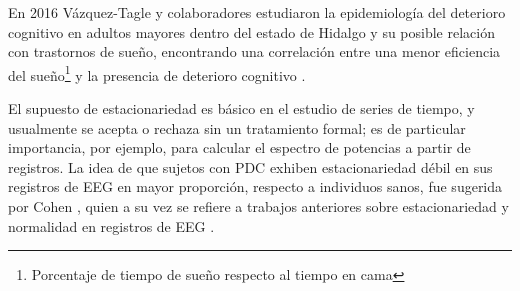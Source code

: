 En 2016 Vázquez-Tagle y colaboradores estudiaron la epidemiología del deterioro cognitivo en 
adultos mayores dentro del estado de Hidalgo y su posible relación con trastornos de sueño, 
encontrando una correlación entre una menor eficiencia del sueño\footnote{Porcentaje de tiempo
de sueño respecto al tiempo en cama} y la presencia de deterioro cognitivo \cite{VazquezTagle16}.


El supuesto de estacionariedad es básico en el estudio de series de tiempo, y usualmente se 
acepta o rechaza sin un tratamiento formal; es de particular importancia, por ejemplo, para 
calcular el espectro de potencias a partir de registros.
La idea de que sujetos con PDC exhiben estacionariedad débil en sus registros de EEG en mayor 
proporción, respecto a individuos sanos, fue sugerida por Cohen \cite{Cohen77}, quien a su vez se 
refiere a trabajos anteriores sobre estacionariedad y normalidad en registros de EEG 
\cite{McEwen75,Sugimoto78,Kawabata73}.



